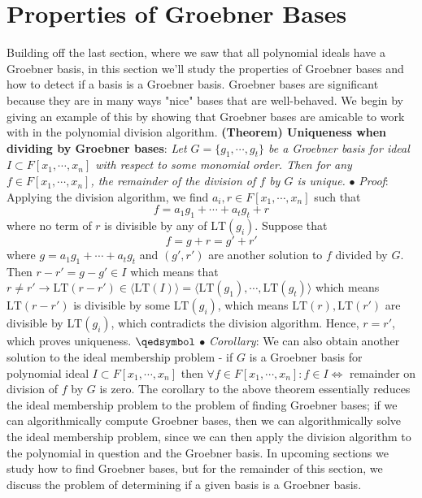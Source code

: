\documentclass{article}
\begin{document}
\section{Properties of Groebner Bases}
Building off the last section, where we saw that all polynomial ideals have a Groebner basis, in this section we'll study the properties of Groebner bases and how to detect if a basis is a Groebner basis. Groebner bases are significant because they are in many ways "nice" bases that are well-behaved. We begin by giving an example of this by showing that Groebner bases are amicable to work with in the polynomial division algorithm.
\newline \newline
\textbf{(Theorem) Uniqueness when dividing by Groebner bases}: \textit{Let $ G = \{ g_1, \cdots, g_t \} $ be a Groebner basis for ideal $ I \subset F[x_1, \cdots, x_n] $ with respect to some monomial order. Then for any $ f \in F[x_1, \cdots, x_n] $, the remainder of the division of $ f $ by $ G $ is unique.}
\newline
\indent $ \bullet $ \textit{Proof}: Applying the division algorithm, we find $ a_i, r \in F[x_1, \cdots, x_n] $ such that
$$ f = a_1 g_1 + \cdots + a_t g_t + r $$
where no term of $ r $ is divisible by any of $ \text{LT}(g_i) $. Suppose that
$$ f = g + r = g' + r' $$
where $ g = a_1 g_1 + \cdots + a_t g_t $ and $ (g', r') $ are another solution to $ f $ divided by $ G $. Then $ r - r' = g - g' \in I $ which means that $ r \neq r' \rightarrow \text{LT}(r - r') \in \langle \text{LT}(I) \rangle = \langle \text{LT}(g_1), \cdots, \text{LT}(g_t) \rangle $ which means $ \text{LT}(r - r') $ is divisible by some $ \text{LT}(g_i) $, which means $ \text{LT}(r), \text{LT}(r') $ are divisible by $ \text{LT}(g_i) $, which contradicts the division algorithm. Hence, $ r = r' $, which proves uniqueness. $ \qedsymbol $
\newline
\indent $ \bullet $ \textit{Corollary}: We can also obtain another solution to the ideal membership problem - if $ G $ is a Groebner basis for polynomial ideal $ I \subset F[x_1, \cdots, x_n] $ then $ \forall f \in F[x_1, \cdots, x_n]: f \in I \iff $ remainder on division of $ f $ by $ G $ is zero.
\newline \newline
The corollary to the above theorem essentially reduces the ideal membership problem to the problem of finding Groebner bases; if we can algorithmically compute Groebner bases, then we can algorithmically solve the ideal membership problem, since we can then apply the division algorithm to the polynomial in question and the Groebner basis. In upcoming sections we study how to find Groebner bases, but for the remainder of this section, we discuss the problem of determining if a given basis is a Groebner basis.
\end{document}
